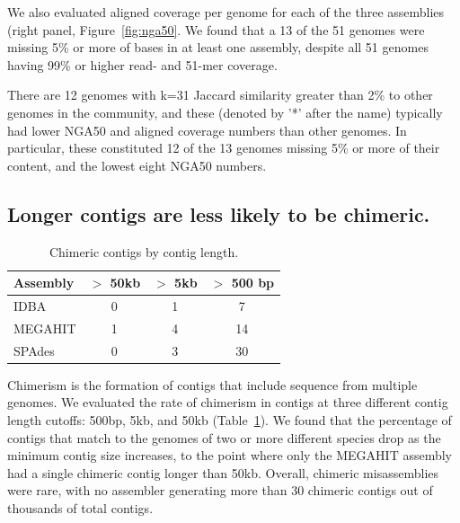 \documentclass[11pt]{article}
\begin{document}
We also evaluated aligned coverage per genome for each of the three
assemblies (right panel, Figure~\ref{fig:nga50}.  We found that a 13
of the 51 genomes were missing 5\% or more of bases in at least one
assembly, despite all 51 genomes having 99\% or higher read- and
51-mer coverage.

There are 12 genomes with k=31 Jaccard similarity greater than 2\% to
other genomes in the community, and these (denoted by '*' after the
name) typically had lower NGA50 and aligned coverage numbers than
other genomes.  In particular, these constituted 12 of the 13 genomes
missing 5\% or more of their content, and the lowest eight NGA50 numbers.

\subsection*{Longer contigs are less likely to be chimeric.}

\begin{table}[!h]
\centering
\caption{Chimeric contigs by contig length.}
\begin{tabular}{|l|c|c|c|}\hline
\textbf{Assembly} & \textbf {$>$ 50kb} & \textbf {$>$ 5kb} & \textbf{$>$ 500 bp}
\\ \hline

IDBA         & 0 & 1 & 7 \\
MEGAHIT      & 1 & 4 & 14 \\ 
SPAdes       & 0 & 3 & 30 \\
\hline

\end{tabular}
\label{table:contig-chimera}

\end{table}


Chimerism is the formation of contigs that include sequence from
multiple genomes.  We evaluated the rate of chimerism in contigs at
three different contig length cutoffs: 500bp, 5kb, and 50kb
(Table~\ref{table:contig-chimera}).  We found that the percentage of
contigs that match to the genomes of two or more different species
drop as the minimum contig size increases, to the point where only the
MEGAHIT assembly had a single chimeric contig longer than 50kb.
Overall, chimeric misassemblies were rare, with no assembler
generating more than 30 chimeric contigs out of thousands of total
contigs.
\end{document}
